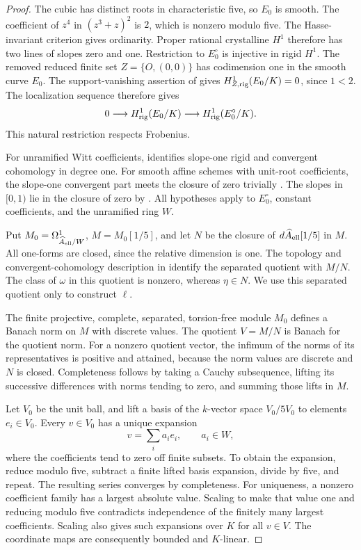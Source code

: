 \begin{proof}
The cubic has distinct roots in characteristic five, so \(E_0\) is
smooth. The coefficient of \(z^4\) in \((z^3+z)^2\) is \(2\),
which is nonzero modulo five.
The Hasse-invariant criterion
\cite[Theorem~V.4.1(a), p.~148]{SilvermanAEC2009} gives ordinarity.
Proper rational crystalline \(H^1\) therefore has two lines of
slopes zero and one.
Restriction to \(E_0^\circ\) is injective in rigid \(H^1\).
The removed reduced finite set \(Z=\{O,(0,0)\}\) has codimension
one in the smooth curve \(E_0\).
The support-vanishing assertion of
\cite[Theorem~1.1, third assertion, p.~63]{Petrequin2003}
gives \(H^1_{Z,\mathrm{rig}}(E_0/K)=0\), since \(1<2\).
The localization sequence
\cite[Proposition~1.3, p.~64]{Petrequin2003} therefore gives
\[
 0\longrightarrow H^1_{\mathrm{rig}}(E_0/K)
       \longrightarrow H^1_{\mathrm{rig}}(E_0^\circ/K).
\]
This natural restriction respects Frobenius.

For unramified Witt coefficients,
\cite[Theorem~7.3.1]{CaroDAddezio2025} identifies slope-one rigid and
convergent cohomology in degree one.
For smooth affine schemes with unit-root coefficients, the
slope-one convergent part meets the closure of zero trivially
\cite[Theorem~7.3.6]{CaroDAddezio2025}.
The slopes in \([0,1)\) lie in the closure of zero by
\cite[Theorem~7.2.1]{CaroDAddezio2025}.
All hypotheses apply to \(E_0^\circ\), constant coefficients, and
the unramified ring \(W\).

Put \(M_0=\Omega^1_{\widehat A_{\mathrm{ell}}/W}\), \(M=M_0[1/5]\),
and let \(N\) be the closure of
\(d\widehat A_{\mathrm{ell}}[1/5]\) in \(M\).
All one-forms are closed, since the relative dimension is one.
The topology and convergent-cohomology description in
\cite[Definition~7.1.1]{CaroDAddezio2025} identify the separated
quotient with \(M/N\).
The class of \(\omega\) in this quotient is nonzero, whereas
\(\eta\in N\).
We use this separated quotient only to construct \(\ell\).

The finite projective, complete, separated, torsion-free module
\(M_0\) defines a Banach norm on \(M\) with discrete values.
The quotient \(V=M/N\) is Banach for the quotient norm.
For a nonzero quotient vector, the infimum of the norms of its
representatives is positive and attained, because the norm values
are discrete and \(N\) is closed.
Completeness follows by taking a Cauchy subsequence, lifting its
successive differences with norms tending to zero, and summing
those lifts in \(M\).

Let \(V_0\) be the unit ball, and lift a basis of the \(k\)-vector
space \(V_0/5V_0\) to elements \(e_i\in V_0\).
Every \(v\in V_0\) has a unique expansion
\[
 v=\sum_i a_ie_i,\qquad a_i\in W,
\]
where the coefficients tend to zero off finite subsets.
To obtain the expansion, reduce modulo five, subtract a finite
lifted basis expansion, divide by five, and repeat.
The resulting series converges by completeness.
For uniqueness, a nonzero coefficient family has a largest absolute
value. Scaling to make that value one and reducing modulo five
contradicts independence of the finitely many largest coefficients.
Scaling also gives such expansions over \(K\) for all \(v\in V\).
The coordinate maps are consequently bounded and \(K\)-linear.


\end{proof}
